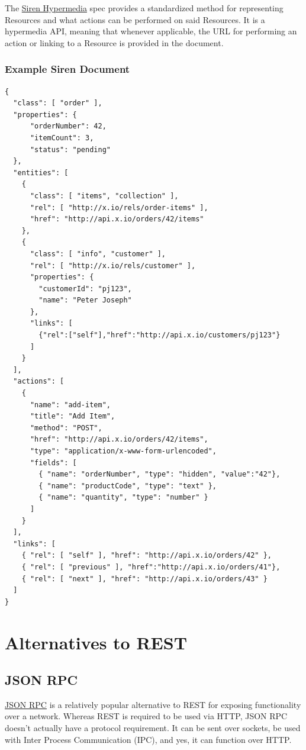 \documentclass{book}
\begin{document}
The \href{http://sirenspec.org}{Siren Hypermedia} spec provides a standardized method for representing Resources and what actions can be performed on said Resources. It is a hypermedia API, meaning that whenever applicable, the URL for performing an action or linking to a Resource is provided in the document.

\subsubsection{Example Siren Document}

\begin{verbatim}
{
  "class": [ "order" ],
  "properties": { 
      "orderNumber": 42, 
      "itemCount": 3,
      "status": "pending"
  },
  "entities": [
    { 
      "class": [ "items", "collection" ], 
      "rel": [ "http://x.io/rels/order-items" ], 
      "href": "http://api.x.io/orders/42/items"
    },
    {
      "class": [ "info", "customer" ],
      "rel": [ "http://x.io/rels/customer" ], 
      "properties": { 
        "customerId": "pj123",
        "name": "Peter Joseph"
      },
      "links": [
        {"rel":["self"],"href":"http://api.x.io/customers/pj123"}
      ]
    }
  ],
  "actions": [
    {
      "name": "add-item",
      "title": "Add Item",
      "method": "POST",
      "href": "http://api.x.io/orders/42/items",
      "type": "application/x-www-form-urlencoded",
      "fields": [
        { "name": "orderNumber", "type": "hidden", "value":"42"},
        { "name": "productCode", "type": "text" },
        { "name": "quantity", "type": "number" }
      ]
    }
  ],
  "links": [
    { "rel": [ "self" ], "href": "http://api.x.io/orders/42" },
    { "rel": [ "previous" ], "href":"http://api.x.io/orders/41"},
    { "rel": [ "next" ], "href": "http://api.x.io/orders/43" }
  ]
}
\end{verbatim}


\section{Alternatives to REST}

\subsection{JSON RPC}

\href{http://www.jsonrpc.org/specification}{JSON RPC} is a relatively popular alternative to REST for exposing functionality over a network. Whereas REST is required to be used via HTTP, JSON RPC doesn't actually have a protocol requirement. It can be sent over sockets, be used with Inter Process Communication (IPC), and yes, it can function over HTTP.
\end{document}
